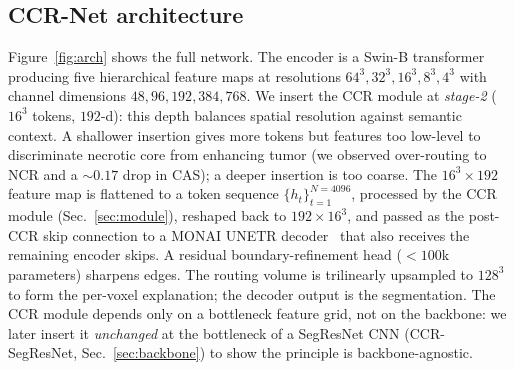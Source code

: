 \documentclass[runningheads]{llncs}
\begin{document}
\subsection{CCR-Net architecture}
Figure~\ref{fig:arch} shows the full network. The encoder is a Swin-B
transformer~\cite{liu2021swin,hatamizadeh2021swinunetr} producing five hierarchical
feature maps at resolutions $64^3,32^3,16^3,8^3,4^3$ with channel dimensions
$48,96,192,384,768$. We insert the CCR module at \emph{stage-2}
($16^3$ tokens, $192$-d): this depth balances spatial resolution against semantic context.
A shallower insertion gives more tokens but features too low-level to discriminate
necrotic core from enhancing tumor (we observed over-routing to NCR and a $\sim0.17$ drop
in CAS); a deeper insertion is too coarse. The $16^3\times192$ feature map is flattened to
a token sequence $\{h_t\}_{t=1}^{N=4096}$, processed by the CCR module
(Sec.~\ref{sec:module}), reshaped back to $192\times16^3$, and passed as the post-CCR skip
connection to a MONAI UNETR decoder~\cite{cardoso2022monai} that also receives the
remaining encoder skips. A residual boundary-refinement head ($<100$k parameters) sharpens
edges. The routing volume is trilinearly upsampled to $128^3$ to form the per-voxel
explanation; the decoder output is the segmentation. The CCR module depends only on a bottleneck
feature grid, not on the backbone: we later insert it \emph{unchanged} at the bottleneck of a
SegResNet CNN (CCR-SegResNet, Sec.~\ref{sec:backbone}) to show the principle is backbone-agnostic.
\end{document}
